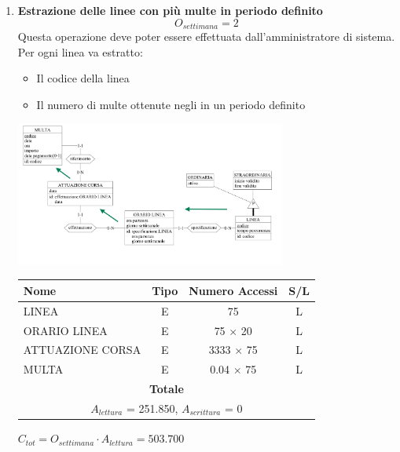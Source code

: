 \documentclass[12pt,a4paper]{report}
\begin{document}
\begin{enumerate}[label=\textbf{\arabic*)}]

    \item\textbf{Estrazione delle linee con più multe in periodo definito} \label{op11} \\
	\[{O_{settimana} = 2}\]
	Questa operazione deve poter essere effettuata dall'amministratore di sistema.\\
	Per ogni linea va estratto:
	\begin{itemize}
	\renewcommand\labelitemi{--}
	    \item Il codice della linea
	    \item Il numero di multe ottenute negli in un periodo definito
	\end{itemize}
	\begin{center}
	\includegraphics[width=0.7\textwidth]{VisualLineeConPiuMulte}
	\end{center}

	\begin{table}[H]
	\centering
	\begin{tabular}{|l|c|c|c|}
	\hline
	Nome & Tipo & Numero Accessi & S/L \\
	\hline
	LINEA & E & 75 & L \\
	\hline
	ORARIO LINEA & E & 75 $\times$ 20 & L \\
	\hline
	ATTUAZIONE CORSA & E & 3333 $\times$ 75 & L \\
	\hline
	MULTA & E & 0.04 $\times$ 75 & L \\
	    \hline
	    \multicolumn{4}{c}{\textbf{Totale}} \\
	    \multicolumn{4}{c}{${A_{lettura}}$ = 251.850, ${A_{scrittura}}$ = 0} \\
	    \hline
	\end{tabular}
	\end{table}
	    \begin{center}
	    ${C_{tot} = {O_{settimana}}\cdot{A_{lettura}}= 503.700}$
	    \end{center}



\end{enumerate}
\end{document}
